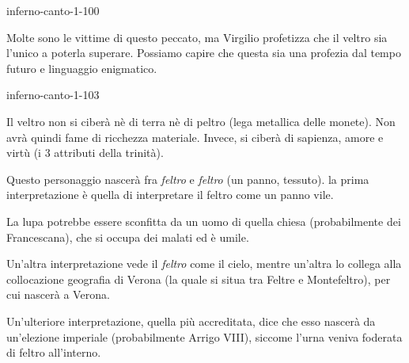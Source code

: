 \documentclass[preview]{standalone}
\begin{document}
\begin{snippet}{inferno-canto-1-100}

    Molte sono le vittime di questo peccato, ma Virgilio profetizza che il veltro sia l'unico
    a poterla superare.
    Possiamo capire che questa sia una profezia dal tempo futuro e linguaggio enigmatico.
\end{snippet}

\begin{snippet}{inferno-canto-1-103}
    
    Il veltro non si ciberà nè di terra nè di peltro (lega metallica delle monete).
    Non avrà quindi fame di ricchezza materiale.
    Invece, si ciberà di sapienza, amore e virtù (i 3 attributi della trinità).
    
    Questo personaggio nascerà fra \textit{feltro} e \textit{feltro} (un panno, tessuto).
    la prima interpretazione è quella di interpretare il feltro come un panno vile.

    La lupa potrebbe essere sconfitta da un uomo di quella chiesa (probabilmente dei Francescana),
    che si occupa dei malati ed è umile.

    Un'altra interpretazione vede il \textit{feltro} come il cielo,
    mentre un'altra lo collega alla collocazione geografia di Verona (la quale si
    situa tra Feltre e Montefeltro), per cui nascerà a Verona.

    Un'ulteriore interpretazione, quella più accreditata, dice che esso nascerà da un'elezione imperiale
    (probabilmente Arrigo VIII), siccome l'urna veniva foderata di feltro all'interno.
\end{snippet}
\end{document}
